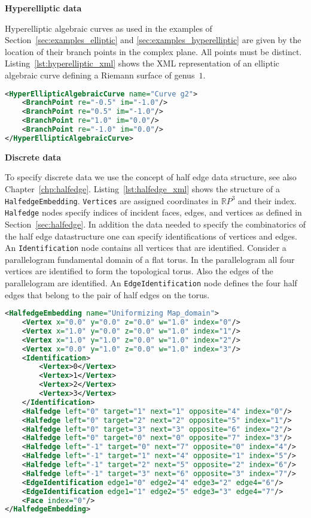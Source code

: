 \documentclass[Thesis.tex]{subfiles}
\begin{document}
{\bf Hyperelliptic data} 

Hyperelliptic algebraic curves as used in the examples of Section~\ref{sec:examples_elliptic} and \ref{sec:examples_hyperelliptic} are given by the location of their branch points in the complex plane. All points must be distinct. Listing~\ref{lst:hyperelliptic_xml} shows the XML representation
of an elliptic algebraic curve defining a Riemann surface of genus~$1$.

\begin{lstlisting}[label=lst:hyperelliptic_xml, caption={A torus given as hyperelliptic data}, numbers=none, language=XML, captionpos=b]
<HyperEllipticAlgebraicCurve name="Curve g2">
	<BranchPoint re="-0.5" im="-1.0"/>
	<BranchPoint re="0.5" im="-1.0"/>
	<BranchPoint re="1.0" im="0.0"/>
	<BranchPoint re="-1.0" im="0.0"/>
</HyperEllipticAlgebraicCurve>
\end{lstlisting}

{\bf Discrete data} 

To specify discrete data we use the concept of half edge data structure, see also Chapter~\ref{chp:halfedge}. Listing~\ref{lst:halfedge_xml}
shows the structure of a {\tt HalfedgeEmbedding}. {\tt Vertices} are assigned coordinates in $\mathbb RP^3$ and their index. {\tt Halfedge}
nodes specify indices of incident faces, edges, and vertices as defined in Section~\ref{sec:halfedge}. In addition the data needed to specify 
the combinatorics of the half edge datastructure one can specify identifications of vertices and edges. An {\tt Identification} node contains
all vertices that are identified. Consider a parallelogram fundamental domain of a flat torus. In the parallelogram all four vertices are identified
to form the topological torus. Also the edges of the parallelogram are identified. An {\tt EdgeIdentification} node defines the four half edges
that belong to the pair of half edges on the torus.

\begin{lstlisting}[label=lst:halfedge_xml, caption={A torus given as {\tt HalfedegeEmbedding}
with identified edge pairs and vertices.}, numbers=none, language=XML, captionpos=b]
<HalfedgeEmbedding name="Uniformizing Map_domain">
	<Vertex x="0.0" y="0.0" z="0.0" w="1.0" index="0"/>
	<Vertex x="1.0" y="0.0" z="0.0" w="1.0" index="1"/>
	<Vertex x="1.0" y="1.0" z="0.0" w="1.0" index="2"/>
	<Vertex x="0.0" y="1.0" z="0.0" w="1.0" index="3"/>
	<Identification>
		<Vertex>0</Vertex>
		<Vertex>1</Vertex>
		<Vertex>2</Vertex>
		<Vertex>3</Vertex>
	</Identification>
	<Halfedge left="0" target="1" next="1" opposite="4" index="0"/>
	<Halfedge left="0" target="2" next="2" opposite="5" index="1"/>
	<Halfedge left="0" target="3" next="3" opposite="6" index="2"/>
	<Halfedge left="0" target="0" next="0" opposite="7" index="3"/>
	<Halfedge left="-1" target="0" next="7" opposite="0" index="4"/>
	<Halfedge left="-1" target="1" next="4" opposite="1" index="5"/>
	<Halfedge left="-1" target="2" next="5" opposite="2" index="6"/>
	<Halfedge left="-1" target="3" next="6" opposite="3" index="7"/>
	<EdgeIdentification edge1="0" edge2="4" edge3="2" edge4="6"/>
	<EdgeIdentification edge1="1" edge2="5" edge3="3" edge4="7"/>
	<Face index="0"/>
</HalfedgeEmbedding>
\end{lstlisting}
\end{document}
